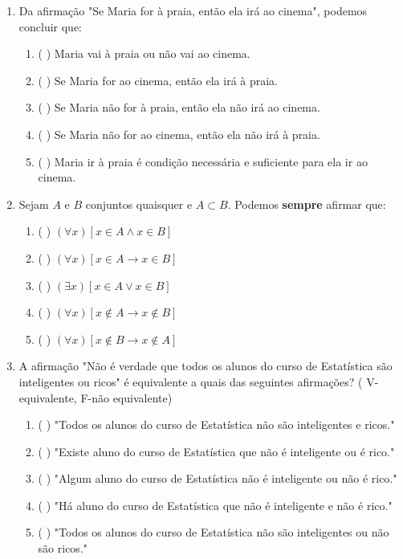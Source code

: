 \documentclass[a4paper,12pt]{letter}  %
\begin{document}
\begin{enumerate}
    \item Da afirmação "Se Maria for à praia, então ela irá ao cinema", podemos concluir que:
    \begin{enumerate}
        \item ( ) Maria vai à praia ou não vai ao cinema.
        \item ( ) Se Maria for ao cinema, então ela irá à praia.
        \item ( ) Se Maria não for à praia, então ela não irá ao cinema.
        \item ( ) Se Maria não for ao cinema, então ela não irá à praia.
        \item ( ) Maria ir à praia é condição necessária e suficiente para ela ir ao cinema.
    \end{enumerate}

    \item Sejam $A$ e $B$ conjuntos quaisquer e $A \subset B$. Podemos \textbf{sempre} afirmar que:
    \begin{enumerate}
        \item ( ) $(\forall x)[x \in A \land x \in B]$
        \item ( ) $(\forall x)[x \in A \rightarrow x \in B]$
        \item ( ) $(\exists x)[x \in A \lor x \in B]$
        \item ( ) $(\forall x)[x \notin A \rightarrow x \notin B]$
        \item ( ) $(\forall x)[x \notin B \rightarrow x \notin A]$
    \end{enumerate}

    \item A afirmação "Não é verdade que todos os alunos do curso de Estatística são inteligentes ou ricos" é equivalente a quais das seguintes afirmações? ( V-equivalente, F-não equivalente)
    \begin{enumerate}
        \item ( ) "Todos os alunos do curso de Estatística não são inteligentes e ricos."
        \item ( ) "Existe aluno do curso de Estatística que não é inteligente ou é rico."
        \item ( ) "Algum aluno do curso de Estatística não é inteligente ou não é rico."
        \item ( ) "Há aluno do curso de Estatística que não é inteligente e não é rico."
        \item ( ) "Todos os alunos do curso de Estatística não são inteligentes ou não são ricos."
    \end{enumerate}


\end{enumerate}
\end{document}

